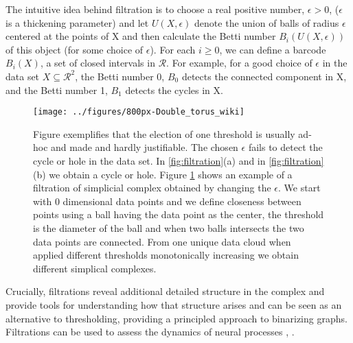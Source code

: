\documentclass[onecollarge,runningheads]{svjour2}
\begin{document}
The intuitive idea behind filtration is to choose a real positive number, $\epsilon > 0$, ($\epsilon$ is a thickening parameter) and let $U(X,\epsilon)$ denote the union of balls of radius $\epsilon$ centered at the points of X and then calculate the Betti number $B_i(U(X,\epsilon))$ of this object (for some choice of $\epsilon$). 
For each $i \geq 0$, we can define a barcode $B_i(X)$, a set of closed intervals in $\mathcal{R}$. For example, for a good choice of $\epsilon$ in the data set $X \subseteq \mathcal{R}^2$, the Betti number 0, $B_0$ detects the connected component in X, and the Betti number 1, $B_1$ detects the cycles in X.

\begin{figure}[h]
% 
        \centering
        \texttt{[image: ../figures/800px-Double\_torus\_wiki]}
        \caption{Figure exemplifies that the election of one threshold is usually ad-hoc and made and hardly justifiable.
        The chosen $\epsilon$ fails to detect the cycle or hole in the data set. In \ref{fig:filtration}(a) and in \ref{fig:filtration}(b) we obtain a cycle or hole. Figure \ref{fig:whyweneedfiltration} shows an example of a filtration of simplicial complex obtained by changing the $\epsilon$. We start with 0 dimensional data points and we define closeness between points using a ball having the data point as the center, the threshold is the diameter of the ball and when two balls intersects the two data points are connected. From one unique data cloud when applied different thresholds monotonically increasing we obtain different simplical complexes.}
\label{fig:whyweneedfiltration}
\end{figure}

Crucially, filtrations reveal additional detailed structure in the complex and provide tools for understanding how that structure arises and can be seen as an alternative to thresholding, providing a principled approach to binarizing graphs. Filtrations can be used to assess the dynamics of neural processes \cite{kim2014morphological},  \cite{giusti2016two}. 
\end{document}
